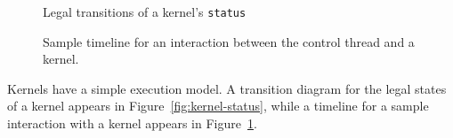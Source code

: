 \clearpage
\begin{figure}[t]
\begin{minipage}{6in}
\vspace{-6pt}
\begin{center}
\end{center}
\vspace{-16pt}
\caption{Legal transitions of a kernel's {\tt status} \protect\label{fig:kernel-status}}
\end{minipage}
\vspace{28pt}

\begin{minipage}{6in}
\begin{center}
\end{center}
\vspace{-16pt}
\caption{Sample timeline for an interaction between the control thread and a kernel. \protect\label{fig:kernel-timeline}}
\end{minipage}
\end{figure}
\clearpage

\callc
\makeline
{}




\callc
\makeline


Kernels have a simple execution model. A transition diagram for the
legal states of a kernel appears in Figure~\ref{fig:kernel-status},
while a timeline for a sample interaction with a kernel appears in
Figure~\ref{fig:kernel-timeline}.

